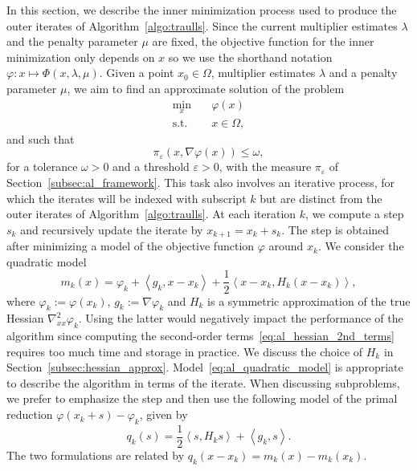 \documentclass{article}
\numberwithin{equation}{section}
\newcommand{\inner}[2]{\left\langle {#1} , {#2} \right\rangle} %
\theoremstyle{plain}
\begin{document}
In this section, we describe the inner minimization process used to produce the outer iterates of Algorithm~\ref{algo:traulls}.
Since the current multiplier estimates $\lambda$ and the penalty parameter $\mu$ are fixed, the objective function for the inner minimization only depends on $x$ so we use the shorthand notation $\varphi : x\mapsto \Phi(x,\lambda,\mu)$.
Given a point $x_0 \in \Omega$, multiplier estimates $\lambda$ and a penalty parameter $\mu$, we aim to find an approximate solution of the problem
\begin{equation}\label{eq:inner_itr_subpb}
	\begin{aligned}
		\min_x \quad & \varphi(x)\\
		\text{s.t.} \quad & x \in \Omega,
	\end{aligned}
\end{equation}
and such that
\begin{equation*}
	\pi_\varepsilon(x,\nabla \varphi(x)) \le \omega,
\end{equation*}
for a tolerance $\omega > 0$ and a threshold $\varepsilon > 0$, with the measure $\pi_\varepsilon$ of Section~\ref{subsec:al_framework}. This task also involves an iterative process, for which the iterates will be indexed with subscript $k$ but are distinct from the outer iterates of Algorithm~\ref{algo:traulls}. At each iteration $k$, we compute a step $s_k$ and recursively update the iterate by $x_{k+1}=x_k+s_k$. The step is obtained after minimizing a model of the objective function $\varphi$ around $x_k$. We consider the quadratic model
\begin{equation}\label{eq:al_quadratic_model}
	m_k(x) = \varphi_k + \inner{g_k}{x-x_k} + \dfrac{1}{2}\inner{x-x_k}{H_k(x-x_k)},
\end{equation}
where $\varphi_k:=\varphi(x_k)$, $g_k:=\nabla \varphi_k$ and $H_k$ is a symmetric approximation of the true Hessian $\nabla^2_{xx} \varphi_k$. Using the latter would negatively impact the performance of the algorithm since computing the second-order terms~\eqref{eq:al_hessian_2nd_terms} requires too much time and storage in practice. We discuss the choice of $H_k$ in Section~\ref{subsec:hessian_approx}. 
Model~\eqref{eq:al_quadratic_model} is appropriate to describe the algorithm in terms of the iterate. When discussing subproblems, we prefer to emphasize the step and then use the following model of the primal reduction $\varphi(x_k+s)-\varphi_k$, given by
\begin{equation*}
	q_k(s) = \dfrac{1}{2}\inner{s}{H_ks} + \inner{g_k}{s}.
\end{equation*}
The two formulations are related by $q_k(x-x_k)=m_k(x)-m_k(x_k)$.
\end{document}

